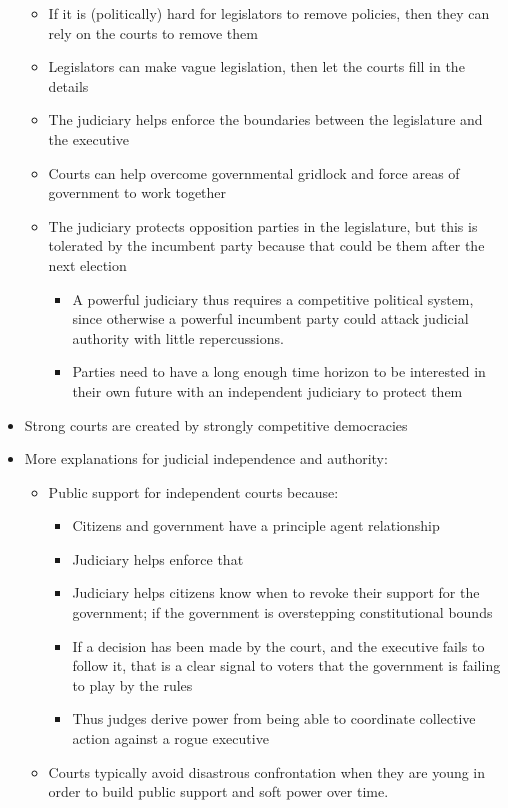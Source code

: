 \documentclass[11pt]{article}
\begin{document}
\begin{itemize}
\begin{itemize}
\item If it is (politically) hard for legislators to remove policies, then they
can rely on the courts to remove them
\item Legislators can make vague legislation, then let the courts fill in the details
\item The judiciary helps enforce the boundaries between the legislature and the
executive
\item Courts can help overcome governmental gridlock and force areas of government
to work together
\item The judiciary protects opposition parties in the legislature, but this is
tolerated by the incumbent party because that could be them after the next election
\begin{itemize}
\item A powerful judiciary thus requires a competitive political system, since
otherwise a powerful incumbent party could attack judicial authority with
little repercussions.
\item Parties need to have a long enough time horizon to be interested in their
own future with an independent judiciary to protect them
\end{itemize}
\end{itemize}
\item Strong courts are created by strongly competitive democracies
\item More explanations for judicial independence and authority:
\begin{itemize}
\item Public support for independent courts because:
\begin{itemize}
\item Citizens and government have a principle agent relationship
\item Judiciary helps enforce that
\item Judiciary helps citizens know when to revoke their support for the
government; if the government is overstepping constitutional bounds
\item If a decision has been made by the court, and the executive fails to
follow it, that is a clear signal to voters that the government is failing
to play by the rules
\item Thus judges derive power from being able to coordinate collective action
against a rogue executive
\end{itemize}
\item Courts typically avoid disastrous confrontation when they are young in order
to build public support and soft power over time.
\end{itemize}
\end{itemize}
\end{document}
